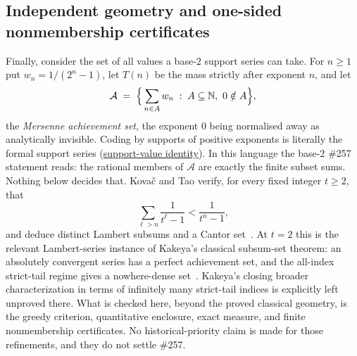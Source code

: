 \documentclass[11pt]{article}
\newcommand{\commit}{bb4e24651b37cd096d3749ef299c3317930b3a3b}
\newcommand{\repobase}{https://github.com/wcook04/plectis-lean-erdos249-257/blob/\commit}
\newcommand{\PK}{Erdos249257}
\newcommand{\lword}[4]{\href{\repobase/\PK/#1\#L#2}{#4}}
\theoremstyle{definition}
\theoremstyle{remark}
\newcommand{\N}{\mathbb{N}}
\begin{document}
\subsection{Independent geometry and one-sided nonmembership certificates}
\label{app:carry-geometry}

Finally, consider the set of all values a base-$2$ support series can
take. For $n\ge1$ put $w_n=1/(2^n-1)$, let $T(n)$ be the mass strictly after
exponent $n$, and let
\[
\mathcal A\;=\;\Bigl\{\,\sum_{n\in A}w_n \;:\; A\subseteq\N,\ 0\notin A\Bigr\},
\]
the \emph{Mersenne achievement set}, the exponent $0$ being normalised away as
analytically invisible. Coding by supports of positive exponents is literally
the formal support series
(\lword{GreedyAchievementSet.lean}{554}{positiveMersenneSupportValue_eq_erdosSupportSeries}{support-value identity}). In
this language the base-$2$ \#257 statement reads: the rational members of
$\mathcal A$ are exactly the finite subset sums. Nothing below decides that.
Kova\v{c} and Tao verify, for every fixed integer $t\ge2$, that
\[
  \sum_{\ell>n}\frac1{t^\ell-1}<\frac1{t^n-1},
\]
and deduce distinct Lambert subsums and a Cantor
set~\cite[Remark~4.1, p.~13]{kovactao}. At
$t=2$ this is the relevant Lambert-series instance of Kakeya's classical
subsum-set theorem: an absolutely convergent series has a perfect achievement
set, and the all-index strict-tail regime gives a nowhere-dense
set~\cite[p.~251]{kakeya1914}.  Kakeya's closing broader characterization in
terms of infinitely many strict-tail indices is explicitly left unproved
there.  What is checked here, beyond the proved classical geometry, is the
greedy criterion, quantitative enclosure, exact measure, and finite
nonmembership certificates.  No historical-priority claim is made for those
refinements, and they do not settle \#257.
\end{document}
